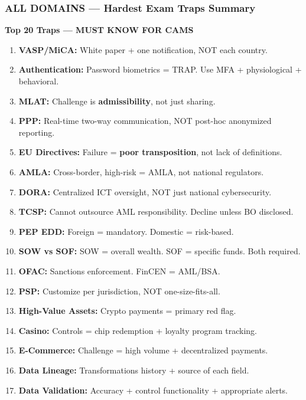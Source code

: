 \documentclass[12pt,aspectratio=169]{beamer}
\renewcommand{\scriptsize}{\fontsize{4.5}{5.5}\selectfont}
\begin{document}
	\begin{frame}
		\frametitle{\fontsize{11}{13}\selectfont \textbf{ALL DOMAINS — Hardest Exam Traps Summary}}
		\scriptsize
		\begin{block}{\fontsize{7}{9}\selectfont \textbf{Top 20 Traps — MUST KNOW FOR CAMS}}
			\scriptsize
			\begin{enumerate}
				\item \textbf{VASP/MiCA:} White paper + one notification, NOT each country.
				\item \textbf{Authentication:} Password biometrics = TRAP. Use MFA + physiological + behavioral.
				\item \textbf{MLAT:} Challenge is \textbf{admissibility}, not just sharing.
				\item \textbf{PPP:} Real-time two-way communication, NOT post-hoc anonymized reporting.
				\item \textbf{EU Directives:} Failure = \textbf{poor transposition}, not lack of definitions.
				\item \textbf{AMLA:} Cross-border, high-risk = AMLA, not national regulators.
				\item \textbf{DORA:} Centralized ICT oversight, NOT just national cybersecurity.
				\item \textbf{TCSP:} Cannot outsource AML responsibility. Decline unless BO disclosed.
				\item \textbf{PEP EDD:} Foreign = mandatory. Domestic = risk-based.
				\item \textbf{SOW vs SOF:} SOW = overall wealth. SOF = specific funds. Both required.
				\item \textbf{OFAC:} Sanctions enforcement. FinCEN = AML/BSA.
				\item \textbf{PSP:} Customize per jurisdiction, NOT one-size-fits-all.
				\item \textbf{High-Value Assets:} Crypto payments = primary red flag.
				\item \textbf{Casino:} Controls = chip redemption + loyalty program tracking.
				\item \textbf{E-Commerce:} Challenge = high volume + decentralized payments.
				\item \textbf{Data Lineage:} Transformations history + source of each field.
				\item \textbf{Data Validation:} Accuracy + control functionality + appropriate alerts.

\end{enumerate}
\end{block}
\end{frame}
\end{document}
